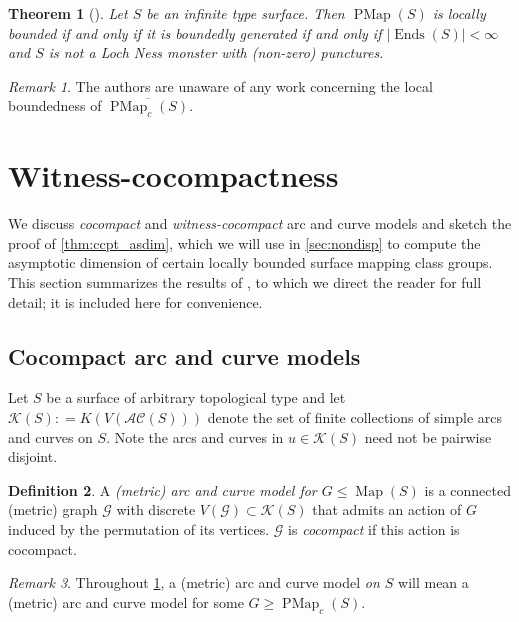 \documentclass[twoside]{amsart}
\theoremstyle{plain}
\newtheorem{theorem}{Theorem}[section]
\theoremstyle{break}
\theoremstyle{definition}
\newtheorem{definition}[theorem]{Definition}
\theoremstyle{remark}
\newtheorem*{remark}{Remark}
\newtheorem{remark*}[theorem]{Remark}
\newcommand{\dfn}{\mathrel{\mathop:}=}
\DeclareMathOperator{\Map}{Map}
\DeclareMathOperator{\Ends}{Ends}
\newcommand{\G}{\mathcal G}
\DeclareMathOperator{\PMap}{PMap}
\begin{document}
\begin{theorem}[{\cite[Thm. ~1.1(b)]{hill}}]\label{thm:hill} 
    Let $S$ be an infinite type surface. 
    Then $\PMap(S)$ is locally bounded if and only if it is boundedly generated
    if and only if $|\Ends(S)|<\infty$ 
    and $S$ is not a Loch Ness monster 
    with (non-zero) punctures.
\end{theorem}


\begin{remark}
  The authors are unaware of any work concerning the local
boundedness of $\overline{\PMap_c(S)}$. 
\end{remark}

\section{Witness-cocompactness}\label{sec:ccpt}

We discuss \textit{cocompact} and \textit{witness-cocompact} arc and curve
models and sketch the proof of \cref{thm:ccpt_asdim}, which
we will use in \cref{sec:nondisp} to compute the asymptotic
dimension of certain locally bounded surface mapping class groups.
This section summarizes the results of
\cite{ga_asdim}, to which we direct the reader for full detail; it
is included here for convenience.

\subsection{Cocompact arc and curve models}\label{sec:ccpt_gm}

Let $S$ be a surface of arbitrary topological type and let 
$\mathcal{K}(S) \dfn K(V(\mathcal{AC}(S)))$ denote the set of finite collections of
simple arcs and curves on $S$.  Note the arcs and curves
in $u \in \mathcal{K}(S)$ need not be pairwise disjoint.  

\begin{definition}\label{def:ccpt}
  A \textit{(metric) arc and curve model for $G \leq \Map(S)$} is a connected 
  (metric) graph $\G$ with discrete $V(\G) \subset \mathcal{K}(S)$ 
  that admits an action of $G$ induced by the
  permutation of its vertices.  $\G$ is \textit{cocompact} if 
  this action is cocompact.
\end{definition}

\begin{remark*}
  Throughout \cref{sec:ccpt}, a (metric) arc and curve model \textit{on
  $S$} will mean a (metric) arc and curve model for some $G \geq \PMap_c(S)$.
\end{remark*}
\end{document}
